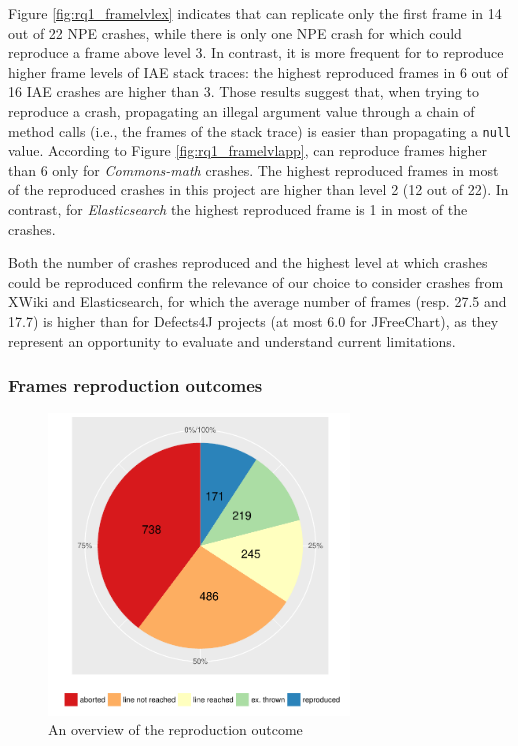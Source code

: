 Figure \ref{fig:rq1_framelvlex} indicates that \evocrash can replicate only the first frame in 14 out of 22 NPE crashes, while there is only one NPE crash for which \evocrash could reproduce a frame above level 3. 
In contrast, it is more frequent for \evocrash to reproduce higher frame levels of IAE stack traces: the highest reproduced frames in 6 out of 16 IAE crashes are higher than 3.
%
Those results suggest that, when trying to reproduce a crash, propagating an illegal argument value through a chain of method calls (i.e., the frames of the stack trace) is easier than propagating a \texttt{null} value. 
%
According to Figure \ref{fig:rq1_framelvlapp}, \evocrash can reproduce frames higher than 6 only for \textit{Commons-math} crashes. The highest reproduced frames in most of the reproduced crashes in this project are higher than level 2 (12 out of 22). 
In contrast, for \textit{Elasticsearch} the highest reproduced frame is 1 in most of the crashes.

Both the number of crashes reproduced and the highest level at which crashes could be reproduced confirm the relevance of our choice to consider crashes from XWiki and Elasticsearch, for which the average number of frames (resp. 27.5 and 17.7) is higher than for Defects4J projects (at most 6.0 for JFreeChart), as they represent an opportunity to evaluate and understand current limitations. 

\subsubsection{Frames reproduction outcomes} 

\begin{figure}[t]
	\centering
	\includegraphics[width=8cm]{papers/jcrashpack/rq1_summary.pdf}
	\caption{An overview of the reproduction outcome}
	\label{fig:rq1summary}
\end{figure}

